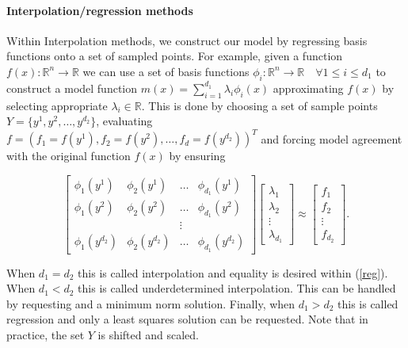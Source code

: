 \documentclass{article}
\let\oldref\ref
\renewcommand{\ref}[1]{(\oldref{#1})}
\begin{document}
\paragraph{Interpolation/regression methods}

Within Interpolation methods, we construct our model by regressing basis functions onto a set of sampled points.
For example, given a function $f(x) : \mathbb R^n \to \mathbb R$ we can use a set of basis functions $\phi_i : \mathbb R^n \to \mathbb R \quad \forall 1 \le i \le d_1$ to construct a model function $m(x) = \sum_{i=1}^{d_1} \lambda_i \phi_i(x)$ approximating $f(x)$ by selecting appropriate $\lambda_i \in \mathbb R$.
This is done by choosing a set of sample points
$Y = \{y^1, y^2, \ldots, y^{d_2}\}$,
evaluating $f = (f_1 = f(y^1), f_2 = f(y^2), \ldots, f_d = f(y^{d_2}))^T$ and forcing model agreement with the original function $f(x)$ by ensuring

\begin{equation}
\label{reg}
\begin{bmatrix}
    \phi_1(y^1)      & \phi_2(y^1)       & \ldots & \phi_{d_1}(y^1)      \\
    \phi_1(y^2)      & \phi_2(y^2)       & \dots  & \phi_{d_1}(y^2)      \\
                     &                   & \vdots &                      \\
    \phi_1(y^{d_2})  & \phi_2(y^{d_2})   & \ldots & \phi_{d_1}(y^{d_2})
\end{bmatrix}
\begin{bmatrix}
    \lambda_1      \\
    \lambda_2      \\
    \vdots         \\            
    \lambda_{d_1}
\end{bmatrix}
\approx
\begin{bmatrix}
    f_1      \\
    f_2      \\
    \vdots         \\            
    f_{d_2}
\end{bmatrix}.
\end{equation}

When $d_1 = d_2$ this is called interpolation and equality is desired within \ref{reg}.
When $d_1 < d_2$ this is called underdetermined interpolation.
This can be handled by requesting and a minimum norm solution.
Finally, when $d_1 > d_2$ this is called regression and only a least squares solution can be requested.
Note that in practice, the set $Y$ is shifted and scaled.
\end{document}

